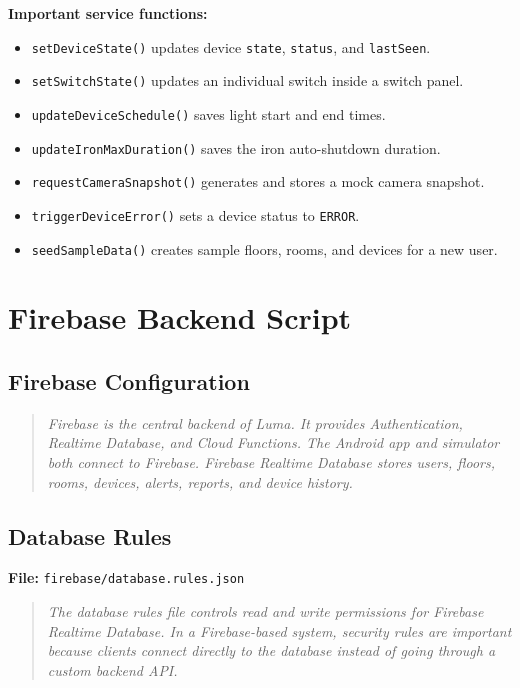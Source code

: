 \documentclass[11pt,a4paper]{article}
\begin{document}
\textbf{Important service functions:}
\begin{itemize}
    \item \texttt{setDeviceState()} updates device \texttt{state}, \texttt{status}, and \texttt{lastSeen}.
    \item \texttt{setSwitchState()} updates an individual switch inside a switch panel.
    \item \texttt{updateDeviceSchedule()} saves light start and end times.
    \item \texttt{updateIronMaxDuration()} saves the iron auto-shutdown duration.
    \item \texttt{requestCameraSnapshot()} generates and stores a mock camera snapshot.
    \item \texttt{triggerDeviceError()} sets a device status to \texttt{ERROR}.
    \item \texttt{seedSampleData()} creates sample floors, rooms, and devices for a new user.
\end{itemize}

\section{Firebase Backend Script}

\subsection{Firebase Configuration}
\begin{quote}
\textit{Firebase is the central backend of Luma. It provides Authentication, Realtime Database, and Cloud Functions. The Android app and simulator both connect to Firebase. Firebase Realtime Database stores users, floors, rooms, devices, alerts, reports, and device history.}
\end{quote}

\subsection{Database Rules}
\textbf{File:} \texttt{firebase/database.rules.json}

\begin{quote}
\textit{The database rules file controls read and write permissions for Firebase Realtime Database. In a Firebase-based system, security rules are important because clients connect directly to the database instead of going through a custom backend API.}
\end{quote}
\end{document}
